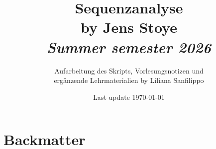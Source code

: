 
\usepackage[ngerman]{babel}








\usepackage{biblatex}

\title{Sequenzanalyse \\ \small{by Jens Stoye} \\ \textit{\footnotesize{Summer semester 2026} } }
\author{Aufarbeitung des Skripts, Vorlesungsnotizen und \\ ergänzende Lehrmaterialien by Liliana Sanfilippo}
\date{Last update \today}

\newcommand\reporttitle{Lecture Sequenzanalyse}
\newcommand\reportsubtitle{}
\newcommand\profs{Vorlesung von Jens Stoye}
\newcommand\reportsubsubtitle{Vorlesungsnotizen und Aufarbeitung}
\newcommand\reportauthors{
    \textbf{Liliana Sanfilippo}
}


    \frontmatter
    
    {\hypersetup{linkcolor=black} %
    \tableofcontents\thispagestyle{empty}}
    \newpage

    \mainmatter





    \backmatter


    \chapter{Backmatter}\label{ch:backmatter}

    \listoffigures

    \printindex

    \printglossary[type=defi, title=Definitions]



